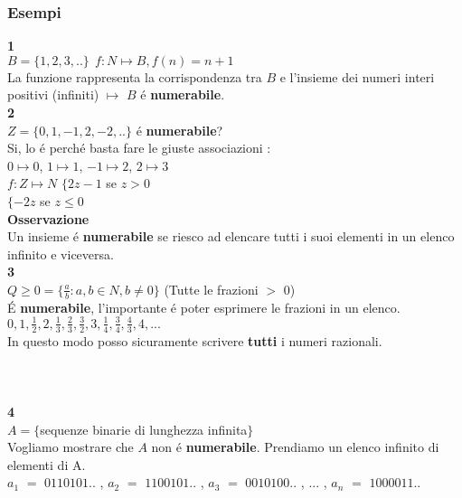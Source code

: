 \documentclass[11pt]{article}
\begin{document}
        \subsubsection{Esempi}
            \textbf{\large 1}\\
            $B=\{1,2,3,..\} \ \ f:N\mapsto B , f(n)=n+1 $ \\
            La funzione rappresenta la corrispondenza tra $B$ e l'insieme dei numeri interi positivi (infiniti) $\longmapsto$ $B$ \'e \textbf{numerabile}.\\
            \textbf{\large 2}\\
            $Z=\{0,1,-1,2,-2,..\}$ \'e \textbf{numerabile}? \\
            Si, lo \'e perch\'e basta fare le giuste associazioni : \\
            $0\longmapsto 0 $, $1\longmapsto1$, $-1\longmapsto2$, $2\longmapsto3$\\
            $f:Z\mapsto N $ $\{2z-1 $ se $z>0$ \\
            \hspace*{1,8cm} $\{-2z  $ \hspace{0,35cm}se $z\leq0$  \\
            \textbf{Osservazione}\\
            Un insieme \'e \textbf{numerabile} se riesco ad elencare tutti i suoi elementi in un elenco infinito e viceversa.\\
            \textbf{3}\\
            $Q \geq 0 =\{\frac{a}{b}:a,b \in N , b\ne 0\}$ (Tutte le frazioni $>$ 0)\\
            \'E \textbf{numerabile}, l'importante \'e poter esprimere le frazioni in un elenco.\\
            $0,1,\frac{1}{2},2,\frac{1}{3},\frac{2}{3},\frac{3}{2},3,\frac{1}{4},\frac{3}{4},\frac{4}{3},4, ...$\\ In questo modo posso sicuramente scrivere \textbf{tutti} i numeri razionali.\\
            \\\\\\
            \textbf{\large 4}\\
            $A=\{$sequenze binarie di lunghezza infinita$\}$\\
            Vogliamo mostrare che $A$ non \'e \textbf{numerabile}. Prendiamo un elenco infinito di elementi di A.\\
            $a_{1}$ $=$ $0110101..$ , $a_{2}$ $=$ $1100101..$ , $a_{3}$ $=$ $0010100..$ , $...$ , $a_{n}$ $=$ $1000011..$\\
\end{document}
